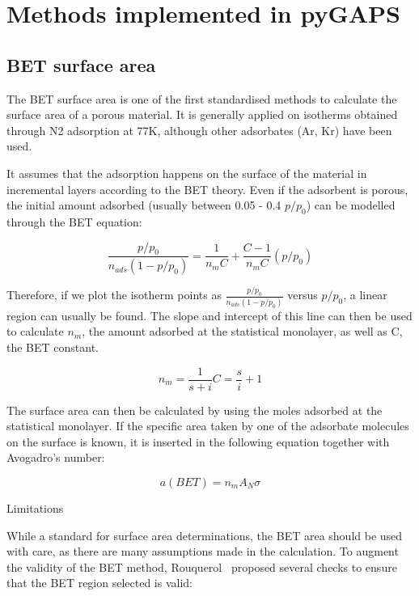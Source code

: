 
\section{Methods implemented in pyGAPS}

\subsection{BET surface area}

The BET surface area is one of the first standardised methods to calculate the
surface area of a porous material. It is generally applied on isotherms obtained
through N2 adsorption at 77K, although other adsorbates (Ar, Kr) have been used.

It assumes that the adsorption happens on the surface of the material in
incremental layers according to the BET theory. Even if the adsorbent is porous,
the initial amount adsorbed (usually between 0.05 - 0.4 \(p/p_0\)) can be
modelled through the BET equation:

\begin{equation}
    \frac{p/p_0}{n_{ads} (1-p/p_0)} = \frac{1}{n_{m} C} + \frac{C - 1}{n_{m} C}(p/p_0)
\end{equation}


Therefore, if we plot the isotherm points as
\(\frac{p/p_0}{n_{ads}(1-p/p_0)}\) versus \(p/p_0\), a linear region
can usually be found. The slope and intercept of this line
can then be used to calculate \(n_{m}\), the amount adsorbed at the
statistical monolayer, as well as C, the BET constant.

\begin{equation}
    n_{m} = \frac{1}{s+i}
    C = \frac{s}{i} + 1
\end{equation}

The surface area can then be calculated by using the moles
adsorbed at the statistical monolayer. If the specific area taken
by one of the adsorbate molecules on the surface is known, it is
inserted in the following equation together with Avogadro's number:

\begin{equation}
    a(BET) = n_m A_N \sigma
\end{equation}


Limitations

While a standard for surface area determinations, the BET area
should be used with care, as there are many assumptions made in
the calculation. To augment the validity of the BET
method, Rouquerol~\cite{rouquerolAdsorptionPowdersPorous2013} proposed
several checks to ensure that the BET region selected is valid:

